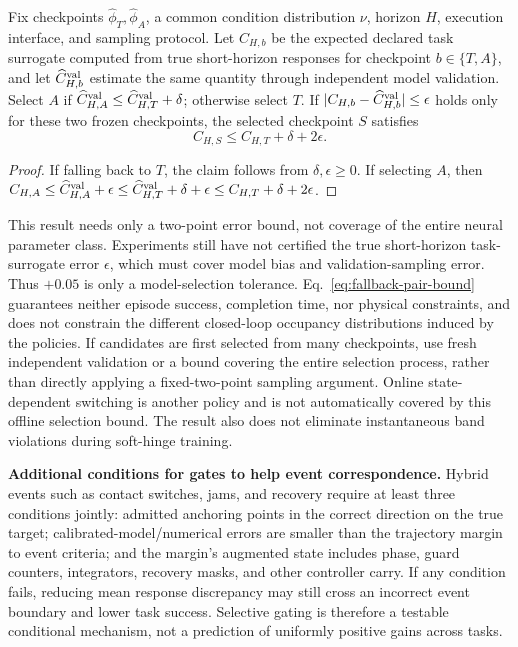 \begin{proposition}
Fix checkpoints $\widehat\phi_T,\widehat\phi_A$, a common condition distribution $\nu$,
horizon $H$, execution interface, and sampling protocol. Let $C_{H,b}$ be the expected declared task surrogate
computed from true short-horizon responses for checkpoint $b\in\{T,A\}$,
and let $\widehat C^{\rm val}_{H,b}$ estimate the same quantity through independent model validation.
Select $A$ if $\widehat C^{\rm val}_{H,A}\le
\widehat C^{\rm val}_{H,T}+\delta$; otherwise select $T$.
If $|C_{H,b}-\widehat C^{\rm val}_{H,b}|\le\epsilon$ holds only for these two frozen checkpoints,
the selected checkpoint $S$ satisfies
\begin{equation}
 C_{H,S}\le C_{H,T}+\delta+2\epsilon.
 \label{eq:fallback-pair-bound}
\end{equation}
\end{proposition}
\begin{proof}
If falling back to $T$, the claim follows from $\delta,\epsilon\ge0$. If selecting $A$, then
$C_{H,A}\le\widehat C^{\rm val}_{H,A}+\epsilon
\le\widehat C^{\rm val}_{H,T}+\delta+\epsilon
\le C_{H,T}+\delta+2\epsilon$.
\end{proof}
This result needs only a two-point error bound, not coverage of the entire neural parameter class. Experiments still have not certified
the true short-horizon task-surrogate error $\epsilon$, which must cover model bias and validation-sampling error.
Thus $+0.05$ is only a model-selection tolerance. Eq.~\eqref{eq:fallback-pair-bound}
guarantees neither episode success, completion time, nor physical constraints, and does not constrain the different
closed-loop occupancy distributions induced by the policies. If candidates are first selected from many checkpoints, use fresh independent validation
or a bound covering the entire selection process, rather than directly applying a fixed-two-point sampling argument.
Online state-dependent switching is another policy and is not automatically covered by this offline selection bound.
The result also does not eliminate instantaneous band violations during soft-hinge training.

\textbf{Additional conditions for gates to help event correspondence.} Hybrid events such as contact switches, jams,
and recovery require at least three conditions jointly: admitted anchoring points in the correct direction on the true target;
calibrated-model/numerical errors are smaller than the trajectory margin to event criteria; and the margin's
augmented state includes phase, guard counters, integrators, recovery masks, and other
controller carry. If any condition fails, reducing mean response discrepancy may still cross
an incorrect event boundary and lower task success. Selective gating is therefore a testable
conditional mechanism, not a prediction of uniformly positive gains across tasks.

